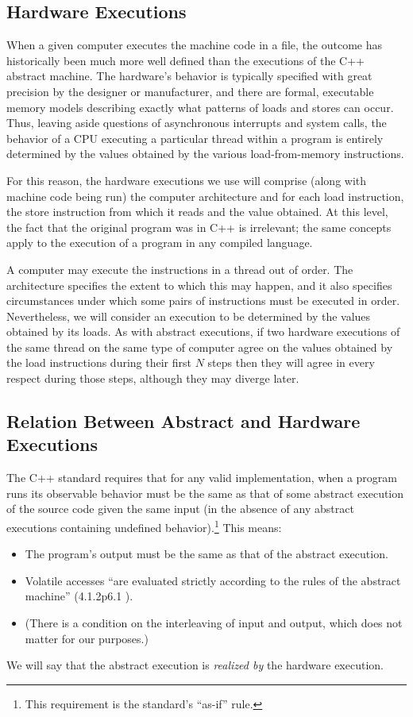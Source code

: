 \documentclass[10]{article}
\begin{document}
\subsection{Hardware Executions}
\label{sec:Hardware Executions}

When a given computer executes the machine code in a file, the outcome
has historically been much more well defined than the executions of the
C++ abstract machine.
The hardware's behavior is typically specified with great precision by
the designer or manufacturer, and there are formal, executable memory models
describing exactly what patterns of loads and stores can occur.
Thus, leaving aside questions of asynchronous interrupts and system
calls, the behavior of a CPU executing a particular thread within a
program is entirely determined by the values obtained by the various
load-from-memory instructions.

For this reason, the hardware executions we use will comprise (along
with machine code being run) the computer architecture and for each
load instruction, the store instruction from which it reads and the
value obtained.
At this level, the fact that the original program was in C++ is
irrelevant; the same concepts apply to the execution of a program in
any compiled language.

A computer may execute the instructions in a thread out of order.
The architecture specifies the extent to which this may happen, and it
also specifies circumstances under which some pairs of instructions
must be executed in order.
Nevertheless, we will consider an execution to be determined by the
values obtained by its loads.
As with abstract executions, if two hardware executions of the same
thread on the same type of computer agree on the values obtained by
the load instructions during their first $N$ steps then they will
agree in every respect during those steps, although they may diverge
later.

\subsection{Relation Between Abstract and Hardware Executions}
\label{sec:Relation Between Abstract and Hardware Executions}

The C++ standard requires that for any valid implementation, when a
program runs its observable behavior must be the same as that of some
abstract execution of the source code given the same input (in the
absence of any abstract executions containing undefined behavior).\footnote{
	This requirement is the standard's ``as-if'' rule.}
This means:
\begin{itemize}
\item	The program's output must be the same as that of the abstract
	execution.
\item	Volatile accesses ``are evaluated strictly according to the
	rules of the abstract machine'' (4.1.2p6.1 ).
\item	(There is a condition on the interleaving of input and output,
	which does not matter for our purposes.)
\end{itemize}
We will say that the abstract execution is \emph{realized by} the
hardware execution.
\end{document}
